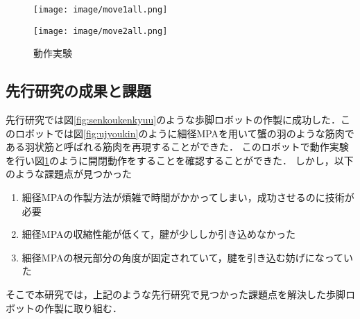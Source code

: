 \begin{figure}[tbp]
  \begin{minipage}{1\hsize}
    \centering
    \texttt{[image: image/move1all.png]}
    \label{fig:move1}
  \end{minipage}
  \begin{minipage}{1\hsize}
    \centering
    \texttt{[image: image/move2all.png]}
    \label{fig:move2}
  \end{minipage}
%
  \caption{動作実験}
  \label{fig:movea12}
\end{figure}
%
\subsection{先行研究の成果と課題}
先行研究では図\ref{fig:senkoukenkyuu}\cite{hasegawa}のような歩脚ロボットの作製に成功した．このロボットでは図\ref{fig:ujyoukin}\cite{hasegawa}のように細径MPAを用いて蟹の羽のような筋肉である羽状筋と呼ばれる筋肉を再現することができた．
このロボットで動作実験を行い図\ref{fig:movea12}\cite{hasegawa}のように開閉動作をすることを確認することができた．
しかし，以下のような課題点が見つかった
\begin{enumerate}
  \item 細径MPAの作製方法が煩雑で時間がかかってしまい，成功させるのに技術が必要
  \item 細径MPAの収縮性能が低くて，腱が少ししか引き込めなかった
  \item 細径MPAの根元部分の角度が固定されていて，腱を引き込む妨げになっていた
\end{enumerate}
そこで本研究では，上記のような先行研究で見つかった課題点を解決した歩脚ロボットの作製に取り組む．
